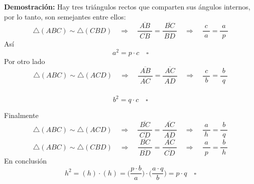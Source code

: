 \documentclass[handout]{beamer}
\begin{document}
\begin{frame}
    \frametitle{}
    {\bfseries Demostración:} Hay tres triángulos rectos que comparten sus ángulos internos,
    por lo tanto, son semejantes entre ellos:
    \begin{equation*}
        \triangle (ABC) \sim \triangle (CBD) \quad \Rightarrow \quad \dfrac{\;\overline{AB}\;}{\overline{CB}} = \dfrac{\;\overline{BC}\;}{\overline{BD}} \quad \Rightarrow \quad \dfrac{\;c\;}{a} = \dfrac{\;a\;}{p}
    \end{equation*}
    Así
    \begin{equation*}
        a^2 = p \cdot c \quad \square
    \end{equation*}
    Por otro lado
    \begin{equation*}
        \triangle (ABC) \sim \triangle (ACD) \quad \Rightarrow \quad \dfrac{\;\overline{AB}\;}{\overline{AC}} = \dfrac{\;\overline{AC}\;}{\overline{AD}} \quad \Rightarrow \quad \dfrac{\;c\;}{b} = \dfrac{\;b\;}{q}
    \end{equation*}
\end{frame}

\begin{frame}
    \frametitle{}

    \begin{equation*}
        b^2 = q \cdot c \quad \square
    \end{equation*}

    Finalmente
    \begin{equation*}
        \triangle (ABC) \sim \triangle (ACD) \quad \Rightarrow \quad \dfrac{\;\overline{BC}\;}{\overline{CD}} = \dfrac{\;\overline{AC}\;}{\overline{AD}} \quad \Rightarrow \quad \dfrac{\;a\;}{h} = \dfrac{\;b\;}{q}
    \end{equation*}
    \begin{equation*}
        \triangle (ABC) \sim \triangle (CBD) \quad \Rightarrow \quad \dfrac{\;\overline{BC}\;}{\overline{BD}} = \dfrac{\;\overline{AC}\;}{\overline{CD}} \quad \Rightarrow \quad \dfrac{\;a\;}{p} = \dfrac{\;b\;}{h}
    \end{equation*}
    En conclusión
    \begin{equation*}
        h^2 = (h)\cdot (h) = \bigg(\dfrac{p\cdot b}{a}\bigg)\cdot\bigg(\dfrac{a\cdot q}{b}\bigg) = p\cdot q \quad \square
    \end{equation*}

\end{frame}
\end{document}
